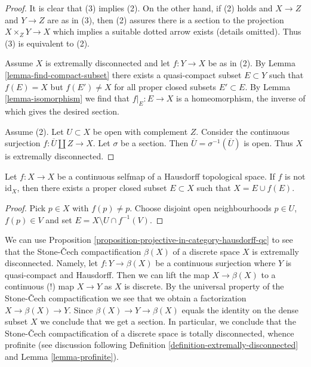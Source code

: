 \begin{proof}
It is clear that (3) implies (2). On the other hand, if (2) holds
and $X \to Z$ and $Y \to Z$ are as in (3), then (2) assures there
is a section to the projection $X \times_Z Y \to X$ which implies
a suitable dotted arrow exists (details omitted). Thus (3)
is equivalent to (2).

\medskip\noindent
Assume $X$ is extremally disconnected and let $f : Y \to X$ be as in (2).
By Lemma \ref{lemma-find-compact-subset} there exists a quasi-compact subset
$E \subset Y$ such that $f(E) = X$ but $f(E') \not = X$ for all
proper closed subsets $E' \subset E$. By
Lemma \ref{lemma-isomorphism} we find that $f|_E : E \to X$
is a homeomorphism, the inverse of which gives the desired section.

\medskip\noindent
Assume (2). Let $U \subset X$ be open with complement $Z$.
Consider the continuous surjection $f : \overline{U} \amalg Z \to X$.
Let $\sigma$ be a section. Then $\overline{U} = \sigma^{-1}(\overline{U})$
is open. Thus $X$ is extremally disconnected.
\end{proof}

\begin{lemma}
\label{lemma-rainwater}
Let $f : X \to X$ be a continuous selfmap of a Hausdorff topological space.
If $f$ is not $\text{id}_X$, then there exists a proper closed subset
$E \subset X$ such that $X = E \cup f(E)$.
\end{lemma}

\begin{proof}
Pick $p \in X$ with $f(p) \not = p$. Choose disjoint open neighbourhoods
$p \in U$, $f(p) \in V$ and set $E = X \setminus U \cap f^{-1}(V)$.
\end{proof}

\begin{example}
\label{example-stone-Cech-discrete}
We can use Proposition \ref{proposition-projective-in-category-hausdorff-qc}
to see that the Stone-{\v C}ech compactification $\beta(X)$ of a discrete
space $X$ is extremally disconnected. Namely, let $f : Y \to \beta(X)$ be
a continuous surjection where $Y$ is quasi-compact and Hausdorff. Then
we can lift the map $X \to \beta(X)$ to a continuous (!) map
$X \to Y$ as $X$ is discrete. By the universal property of the
Stone-{\v C}ech compactification we see that we obtain a factorization
$X \to \beta(X) \to Y$. Since $\beta(X) \to Y \to \beta(X)$ equals
the identity on the dense subset $X$ we conclude that we get a section.
In particular, we conclude that the Stone-{\v C}ech compactification
of a discrete space is totally disconnected, whence profinite
(see discussion following
Definition \ref{definition-extremally-disconnected} and
Lemma \ref{lemma-profinite}).
\end{example}

